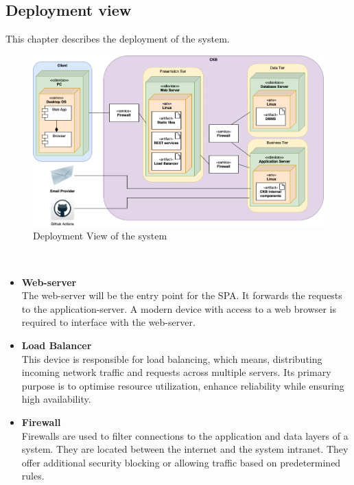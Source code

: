 \newpage

\subsection{Deployment view}
This chapter describes the deployment of the system.
\begin{figure}[ht]
    \centering
    \includegraphics[width=1\linewidth]{src/Deployment View of the system.png}
    \caption{Deployment View of the system}
    \label{fig:Deployment View of the system}
\end{figure}
\\
\begin{itemize}
    \item \textbf{Web-server}\\
    The web-server will be the entry point for the SPA. It forwards the requests to the application-server. A modern device with access to a web browser is required to interface with the web-server. 
    \item \textbf{Load Balancer}\\
    This device is responsible for load balancing, which means, distributing incoming network traffic and requests across multiple servers. Its primary purpose is to optimise resource utilization, enhance reliability while ensuring high availability.
    \item \textbf{Firewall}\\
    Firewalls are used to filter connections to the application and data layers of a system. They are located between the internet and the system intranet. They offer additional security blocking or allowing traffic based on predetermined rules.
\end{itemize}

\newpage

